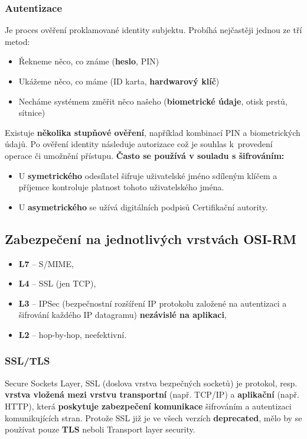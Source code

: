 \subsubsection{Autentizace}
Je proces ověření proklamované identity subjektu. Probíhá nejčastěji jednou ze tří metod:
\begin{itemize}
\item Řekneme něco, co známe (\textbf{heslo}, PIN)
\item Ukážeme něco, co máme (ID karta, \textbf{hardwarový klíč})
\item Necháme systémem změřit něco našeho (\textbf{biometrické údaje}, otisk prstů, sítnice)
\end{itemize}
Existuje \textbf{několika stupňové ověření}, například kombinací PIN a biometrických údajů. Po ověření identity následuje autorizace což je souhlas k provedení operace či umožnění přístupu. \textbf{Často se používá v souladu s šifrováním:}
\begin{itemize}
\item U \textbf{symetrického} odesílatel šifruje uživatelské jméno sdíleným klíčem a příjemce kontroluje platnost tohoto uživatelského jména.
\item U \textbf{asymetrického} se užívá digitálních podpisů Certifikační autority.
\end{itemize}



\subsection{Zabezpečení na jednotlivých vrstvách OSI-RM }
\begin{itemize}
	\item \textbf{L7} – S/MIME,
	\item \textbf{L4} – SSL (jen TCP),
	\item \textbf{L3} – IPSec (bezpečnostní rozšíření IP protokolu založené na autentizaci a šifrování každého IP datagramu) \textbf{nezávislé na aplikaci},
	\item \textbf{L2} – hop-by-hop, neefektivní.
\end{itemize}


\subsubsection{SSL/TLS}
Secure Sockets Layer, SSL (doslova vrstva bezpečných socketů) je protokol, resp. \textbf{vrstva vložená mezi vrstvu transportní} (např. TCP/IP) a \textbf{aplikační} (např. HTTP), která \textbf{poskytuje zabezpečení komunikace} šifrováním a autentizaci komunikujících stran. Protože SSL již je ve všech verzích \textbf{deprecated}, mělo by se používat pouze \textbf{TLS} neboli Transport layer security.

